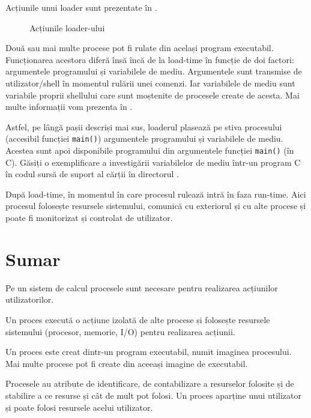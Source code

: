 Acțiunile unui loader sunt prezentate în .

\begin{figure}[!htbp]
  \centering
  \def\svgwidth{0.8\textwidth}
  
  \caption{Acțiunile loader-ului}
  \label{fig:process:loader}
\end{figure}

Două sau mai multe procese pot fi rulate din același program executabil.
Funcționarea acestora diferă însă încă de la load-time în funcție de doi factori: argumentele programului și variabilele de mediu.
Argumentele sunt transmise de utilizator/shell în momentul rulării unei comenzi.
Iar variabilele de mediu sunt variabile proprii shellului care sunt moștenite de procesele create de acesta.
Mai multe informații vom prezenta în .

Astfel, pe lângă pașii descriși mai sus, loaderul plasează pe stiva procesului (accesibil funcției \texttt{main()}) argumentele programului și variabilele de mediu.
Acestea sunt apoi disponibile programului din argumentele funcției \texttt{main()} (în C).
Găsiți o exemplificare a investigării variabilelor de mediu într-un program C în codul sursă de suport al cărții în directorul .

După load-time, în momentul în care procesul rulează intră în faza run-time.
Aici procesul folosește resursele sistemului, comunică cu exteriorul și cu alte procese și poate fi monitorizat și controlat de utilizator.

\section{Sumar}
\label{sec:process:summary}

Pe un sistem de calcul procesele sunt necesare pentru realizarea acțiunilor utilizatorilor.

Un proces execută o acțiune izolată de alte procese și folosește resursele sistemului (procesor, memorie, I/O) pentru realizarea acțiunii.

Un proces este creat dintr-un program executabil, numit imaginea procesului.
Mai multe procese pot fi create din aceeași imagine de executabil.

Procesele au atribute de identificare, de contabilizare a resurselor folosite și de stabilire a ce resurse și cât de mult pot folosi.
Un proces aparține unui utilizator și poate folosi resursele acelui utilizator.

